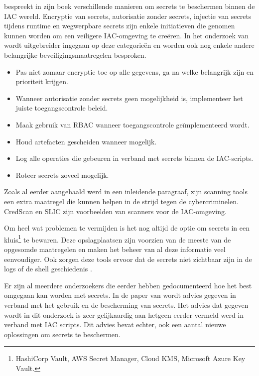 \textcite{Morris2021} bespreekt in zijn boek verschillende manieren om secrets te beschermen binnen de IAC wereld. Encryptie van secrets, autorisatie zonder secrets, injectie van secrets tijdens runtime en wegwerpbare secrets zijn enkele initiatieven die genomen kunnen worden om een veiligere IAC-omgeving te creëren. In het onderzoek van \textcite{Rahman2021} wordt uitgebreider ingegaan op deze categorieën en worden ook nog enkele andere belangrijke beveiligingsmaatregelen besproken.

\begin{itemize}
  \item Pas niet zomaar encryptie toe op alle gegevens, ga na welke belangrijk zijn en prioriteit krijgen.
  \item Wanneer autorisatie zonder secrets geen mogelijkheid is, implementeer het juiste toegangscontrole beleid.
  \item Maak gebruik van RBAC wanneer toegangscontrole geïmplementeerd wordt.
  \item Houd artefacten gescheiden wanneer mogelijk.
  \item Log alle operaties die gebeuren in verband met secrets binnen de IAC-scripts.
  \item Roteer secrets zoveel mogelijk.
\end{itemize}

Zoals al eerder aangehaald werd in een inleidende paragraaf, zijn scanning tools een extra maatregel die kunnen helpen in de strijd tegen de cybercriminelen. CredScan en SLIC zijn voorbeelden van scanners voor de IAC-omgeving.\autocite{Rahman2021} 
\clearpage

Om heel wat problemen te vermijden is het nog altijd de optie om secrets in een kluis\footnote{HashiCorp Vault, AWS Secret Manager, Cloud KMS, Microsoft Azure Key Vault.} te bewaren. Deze opslagplaatsen zijn voorzien van de meeste van de opgesomde maatregelen en maken het beheer van al deze informatie veel eenvoudiger. Ook zorgen deze tools ervoor dat de secrets niet zichtbaar zijn in de logs of de shell geschiedenis \autocite{Agarwal2021}. 
\newline

Er zijn al meerdere onderzoekers die eerder hebben gedocumenteerd hoe het best omgegaan kan worden met secrets. In de paper van \textcite{Basak2023} wordt advies gegeven in verband met het gebruik en de bescherming van secrets. Het advies dat gegeven wordt in dit onderzoek is zeer gelijkaardig aan hetgeen eerder vermeld werd in verband met IAC scripts. Dit advies bevat echter, ook een aantal nieuwe oplossingen om secrets te beschermen.

